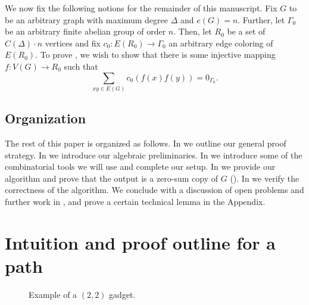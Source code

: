 \documentclass{article}
\theoremstyle{definition}
\begin{document}
We now fix the following notions for the remainder of this manuscript. 
Fix $G$ to be an arbitrary graph with maximum degree $\Delta$ and $e(G)=n$. Further, let $\Gamma_0$ be an arbitrary finite abelian group of order $n$. Then, let $R_0$ be a set of $C(\Delta)\cdot n$ vertices and fix $c_0:E(R_0)\to \Gamma_0$ an arbitrary edge coloring of $E(R_0)$.
To prove , we wish to show that there is some injective mapping $f:V(G)\to R_0$ such that $$\sum_{xy\in E(G)}c_0(f(x)f(y))=0_{\Gamma_0}.$$
 

\subsection{Organization}
The rest of this paper is organized as follows. In  we outline our general proof strategy. In  we introduce our algebraic preliminaries. In  we introduce some of the combinatorial tools we will use and complete our setup. In  we provide our algorithm and prove that the output is a zero-sum copy of $G$ (). In  we verify the correctness of the algorithm. We conclude with a discussion of open problems and further work in , and prove a certain technical lemma in the Appendix.


\section{Intuition and proof outline for a path}\label{sec.example}


\begin{figure}[htb]
\captionsetup{justification=centering}
\centering
\caption{Example of a $(2,2)$ gadget.
}\label{simple_gadget}
\end{figure}
\end{document}
